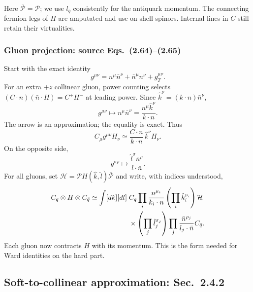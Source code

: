 \documentclass[14pt,a4paper]{extarticle}
\numberwithin{equation}{section}
\begin{document}
Here $\overline{\mathcal P}=\mathcal P$; we use $l_{\bar q}$
consistently for the antiquark momentum.
The connecting fermion legs of $H$ are amputated and use on-shell
spinors. Internal lines in $C$ still retain their virtualities.

\subsubsection{Gluon projection: source Eqs.~(2.64)--(2.65)}
Start with the exact identity
\begin{equation}
 g^{\mu\nu}=n^\mu\bar n^\nu+\bar n^\mu n^\nu+g_T^{\mu\nu}.
\end{equation}
For an extra $+z$ collinear gluon, power counting selects
$(C\cdot n)(\bar n\cdot H)=C^+H^-$ at leading power.
Since $\hat k^\nu=(k\cdot n)\bar n^\nu$,
\begin{equation}
 \boxed{g^{\mu\nu}\longmapsto n^\mu\bar n^\nu
 =\frac{n^\mu\hat k^\nu}{k\cdot n}.}
 \label{eq:notes-gluon-hard}
\end{equation}
The arrow is an approximation; the equality is exact. Thus
\begin{equation}
 C_\mu g^{\mu\nu}H_\nu\simeq
 \frac{C\cdot n}{k\cdot n}\,\hat k^\nu H_\nu.
\end{equation}
On the opposite side,
\begin{equation}
 g^{\sigma\rho}\longmapsto
 \frac{\hat l^\sigma\bar n^\rho}{l\cdot\bar n}.
\end{equation}
For all gluons, set $\mathcal H=\mathcal P H(\hat k,\hat l)
\overline{\mathcal P}$ and write, with indices understood,
\begin{align}
 C_q\otimes H\otimes C_{\bar q}\simeq\int[d k][d l]\;&
 C_q\prod_i\frac{n^{\mu_i}}{k_i\cdot n}
 \left(\prod_i\hat k_i^{\nu_i}\right)\mathcal H\notag\\
 &\times\left(\prod_j\hat l_j^{\sigma_j}\right)
 \prod_j\frac{\bar n^{\rho_j}}{l_j\cdot\bar n}C_{\bar q}.
\end{align}
Each gluon now contracts $H$ with its momentum. This is the form needed
for Ward identities on the hard part.

\subsection{Soft-to-collinear approximation: Sec.~2.4.2}
\label{sec:notes-soft-collinear}
\end{document}
